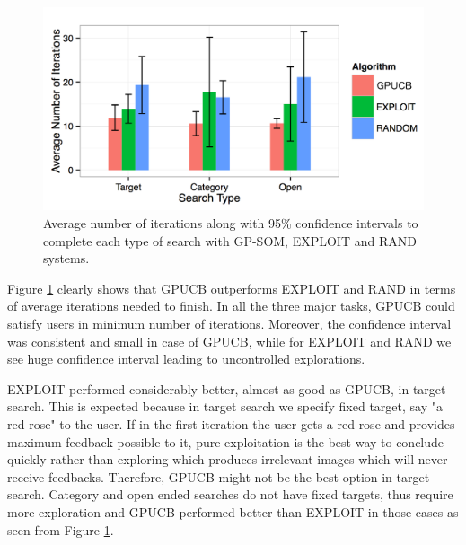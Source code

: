 \documentclass[english]{tktltiki}
\begin{document}
\begin{figure}[h!]
  \centering
    \includegraphics[width=1.0\textwidth]{figures/conf_intr.png}
    \caption{Average number of iterations along with 95\% confidence intervals to complete each type of search with GP-SOM, EXPLOIT and RAND systems.}
    \label{bar_chart}
\end{figure}

Figure \ref{bar_chart} clearly shows that GPUCB outperforms EXPLOIT and RAND in terms of average iterations needed to finish. In all the three major tasks, GPUCB could satisfy users in minimum number of iterations. Moreover, the confidence interval was consistent and small in case of GPUCB, while for EXPLOIT and RAND we see huge confidence interval leading to uncontrolled explorations.

EXPLOIT performed considerably better, almost as good as GPUCB, in target search. This is expected because in target search we specify fixed target, say "a red rose" to the user. If in the first iteration the user gets a red rose and provides maximum feedback possible to it, pure exploitation is the best way to conclude quickly rather than exploring which produces irrelevant images which will never receive feedbacks. Therefore, GPUCB might not be the best option in target search. Category and open ended searches do not have fixed targets, thus require more exploration and GPUCB performed better than EXPLOIT in those cases as seen from Figure \ref{bar_chart}.
\end{document}
